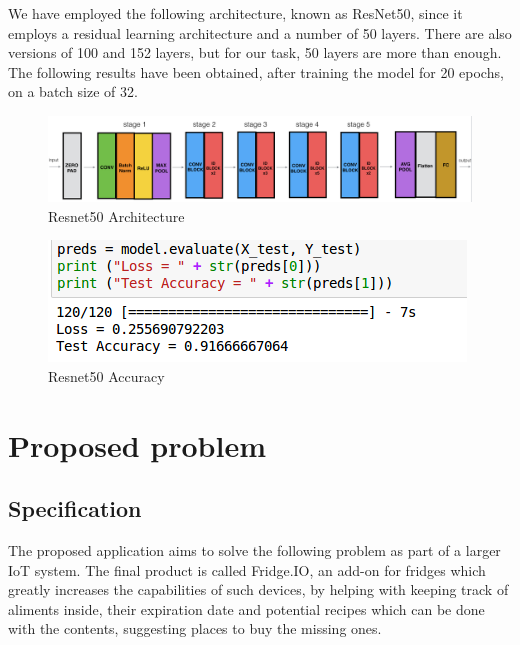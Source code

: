 \documentclass[a4paper,11pt]{article}
\begin{document}
    We have employed the following architecture, known as ResNet50, since it employs a residual learning architecture and a number of 50 layers. There are also versions of 100 and 152 layers, but for our task, 50 layers are more than enough. The following results have been obtained, after training the model for 20 epochs, on a batch size of 32.
    \begin{figure}[H]
    	\includegraphics[width = \textwidth]{resnet50.png}
    	\caption{Resnet50 Architecture}
    \end{figure}
    
    \begin{figure}[H]
    	\includegraphics[width = \textwidth]{resnet50Acc.png}
    	\caption{Resnet50 Accuracy}
    \end{figure}

 \newpage
 \section{Proposed problem}
  \subsection{Specification} 
	The proposed application aims to solve the following problem as part of a larger IoT system. The final product is called Fridge.IO, an add-on for fridges which greatly increases the capabilities of such devices, by helping with keeping track of aliments inside, their expiration date and potential recipes which can be done with the contents, suggesting places to buy the missing ones. 
	
\end{document}
